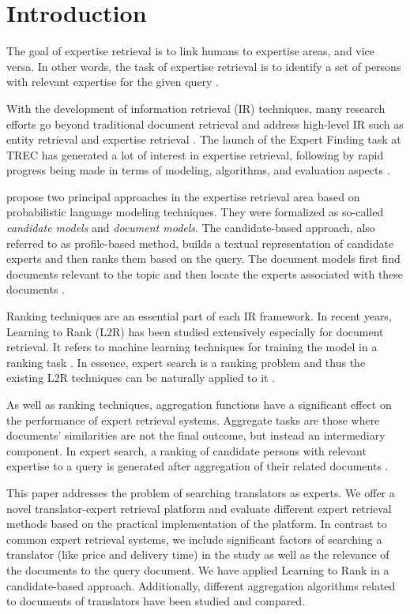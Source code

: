 \section{Introduction}
\label{sec:introduction}
The goal of expertise retrieval is to link humans to expertise areas, and vice versa. In other words, the task of expertise retrieval is to identify a set of persons with relevant expertise for the given query \cite{er,er-community-aware}.

With the development of information retrieval (IR) techniques, many research efforts go beyond traditional document retrieval and address high-level IR such as entity retrieval and expertise retrieval \cite{er-sparse}. The launch of the Expert Finding task at TREC has generated a lot of interest in expertise retrieval, following by rapid progress being made in terms of modeling, algorithms, and evaluation aspects \cite{trec2005,er-community-aware}.

\cite{trec2005} propose two principal approaches  in the expertise retrieval area based on probabilistic language modeling techniques. They were formalized as so-called \textit{candidate models} and \textit{document models}. The candidate-based approach, also referred to as profile-based method, builds a textual representation of candidate experts and then ranks them based on the query. The document models first find documents relevant to the topic and then locate the experts associated with these documents \cite{er}.

Ranking techniques are an essential part of each IR framework. In recent years, Learning to Rank (L2R) has been studied extensively especially for document retrieval. It refers to machine learning techniques for training the model in a ranking task \cite{er}. In essence, expert search is a ranking problem and thus the existing L2R techniques can be naturally applied to it \cite{l2r-intro}.

As well as ranking techniques, aggregation functions have a significant effect on the performance of expert retrieval systems. Aggregate tasks are those where documents' similarities are not
the final outcome, but instead an intermediary component. In expert search, a ranking of candidate persons with relevant expertise to a query is generated after aggregation of their related documents \cite{agg-learning}.

This paper addresses the problem of searching translators as experts. We offer a novel translator-expert retrieval platform and evaluate different expert retrieval methods based on the practical implementation of the platform. In contrast to common expert retrieval systems, we include significant factors of searching a translator (like price and delivery time) in the study as well as the relevance of the documents to the query document. We have applied Learning to Rank in a candidate-based approach. Additionally, different aggregation algorithms related to documents of translators have been studied and compared.

